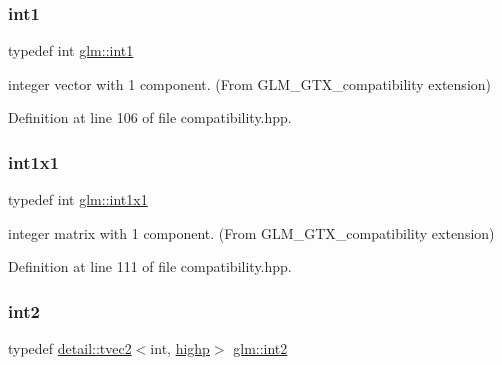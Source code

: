 \subsubsection{\texorpdfstring{int1}{int1}}
{\footnotesize\ttfamily typedef int \hyperlink{group__gtx__compatibility_gaba41d7803e4b24c17656d74377b88286}{glm\+::int1}}



integer vector with 1 component. (From G\+L\+M\+\_\+\+G\+T\+X\+\_\+compatibility extension) 



Definition at line 106 of file compatibility.\+hpp.

\mbox{\label{group__gtx__compatibility_ga09016a637a3cd093c22e6188080ac750}} 
\subsubsection{\texorpdfstring{int1x1}{int1x1}}
{\footnotesize\ttfamily typedef int \hyperlink{group__gtx__compatibility_ga09016a637a3cd093c22e6188080ac750}{glm\+::int1x1}}



integer matrix with 1 component. (From G\+L\+M\+\_\+\+G\+T\+X\+\_\+compatibility extension) 



Definition at line 111 of file compatibility.\+hpp.

\mbox{\label{group__gtx__compatibility_ga3f999377257cbda84c745b688ddcba81}} 
\subsubsection{\texorpdfstring{int2}{int2}}
{\footnotesize\ttfamily typedef \hyperlink{structglm_1_1detail_1_1tvec2}{detail\+::tvec2}$<$int, \hyperlink{namespaceglm_a0f04f086094c747d227af4425893f545ac6f7eab42eacbb10d59a58e95e362074}{highp}$>$ \hyperlink{group__gtx__compatibility_ga3f999377257cbda84c745b688ddcba81}{glm\+::int2}}



